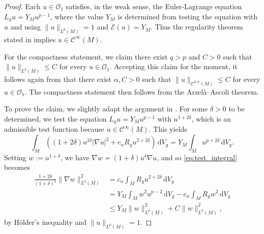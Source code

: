 \documentclass[reqno,11pt]{amsart}
\numberwithin{equation}{section}
\theoremstyle{definition}
\theoremstyle{remark}
\newcommand{\ud}{\,\mathrm{d}}
\begin{document}
\begin{proof}
Each $u \in \mathscr O_1$ satisfies, in the weak sense, the Euler-Lagrange 
equation $L_g u = Y_M u^{p-1}$, where the value $Y_M$ is determined from testing 
the equation with $u$ and using $\|u\|_{L^p(M)} = 1$ and $\mathcal E(u) = Y_M$. Thus 
the regularity theorem stated in \cite[Theorem 4.1]{LP} implies $u \in \mathcal C^\infty(M)$.

For the compactness statement, we claim there exist $q > p$ and $C > 0$ such 
that $\|u\|_{L^q(M)} \leqslant C$ for every $u \in \mathscr O_1$. Accepting this 
claim for the moment, it follows again from \cite[Theorem 4.1]{LP} that  there 
exist $\alpha, C > 0$ such that $\|u\|_{\mathcal C^{2, \alpha}(M)} \leqslant C$ for 
every $u \in \mathscr O_1$. The compactness statement then follows from the Arzel\`a--Ascoli theorem.

To prove the claim, we slightly adapt the argument in \cite[proof of Proposition 4.4]{LP}. 
For some $\delta > 0$ to be determined, we test the equation $L_g u = Y_M u^{p-1}$ with 
$u^{1 + 2 \delta}$, which is an admissible test function because $u \in \mathcal C^\infty(M)$. 
This yields
\begin{equation}\label{eq:test_integral}
\int_M \left( (1 + 2 \delta)  u^{2\delta} |\nabla u|^2  + 
c_n R_g u^{2 + 2\delta} \right) \ud V_g  = Y_M \int_M u^{p + 2 \delta} \ud V_g.
\end{equation}
Setting $w := u^{1 + \delta}$, we have $\nabla w = (1 + \delta) u^\delta \nabla u$, 
and so \eqref{eq:test_integral} becomes 
\begin{align} \label{compactness1}
\frac{1 + 2 \delta}{( 1+ \delta)^2} \|\nabla w\|_{L^2(M)}^2 &=
c_n \int_M R_g u^{2 + 2\delta} \ud V_g  \\ \nonumber
&=  Y_M \int_M w^2 u^{p-2} \ud V_g - c_n \int_M R_g w^2 \ud V_g \\ \nonumber
&\leqslant  Y_M \|w\|_{L^p(M)}^2 + C \|w\|_{L^2(M)}^2,
\end{align} 
by H\"older's inequality and $\|u\|_{L^p(M)} = 1$.


\end{proof}
\end{document}
